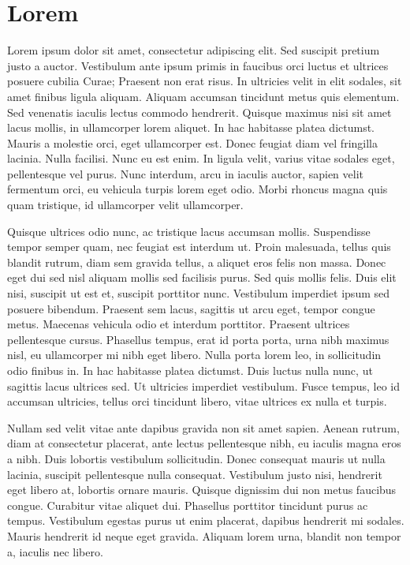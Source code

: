 \chapter{Lorem}

\setcounter{page}{1}

Lorem ipsum dolor sit amet, consectetur adipiscing elit. Sed suscipit pretium justo a auctor. Vestibulum ante ipsum primis in faucibus orci luctus et ultrices posuere cubilia Curae; Praesent non erat risus. In ultricies velit in elit sodales, sit amet finibus ligula aliquam. Aliquam accumsan tincidunt metus quis elementum. Sed venenatis iaculis lectus commodo hendrerit. Quisque maximus nisi sit amet lacus mollis, in ullamcorper lorem aliquet. In hac habitasse platea dictumst. Mauris a molestie orci, eget ullamcorper est. Donec feugiat diam vel fringilla lacinia. Nulla facilisi. Nunc eu est enim. In ligula velit, varius vitae sodales eget, pellentesque vel purus. Nunc interdum, arcu in iaculis auctor, sapien velit fermentum orci, eu vehicula turpis lorem eget odio. Morbi rhoncus magna quis quam tristique, id ullamcorper velit ullamcorper.

Quisque ultrices odio nunc, ac tristique lacus accumsan mollis. Suspendisse tempor semper quam, nec feugiat est interdum ut. Proin malesuada, tellus quis blandit rutrum, diam sem gravida tellus, a aliquet eros felis non massa. Donec eget dui sed nisl aliquam mollis sed facilisis purus. Sed quis mollis felis. Duis elit nisi, suscipit ut est et, suscipit porttitor nunc. Vestibulum imperdiet ipsum sed posuere bibendum. Praesent sem lacus, sagittis ut arcu eget, tempor congue metus. Maecenas vehicula odio et interdum porttitor. Praesent ultrices pellentesque cursus. Phasellus tempus, erat id porta porta, urna nibh maximus nisl, eu ullamcorper mi nibh eget libero. Nulla porta lorem leo, in sollicitudin odio finibus in. In hac habitasse platea dictumst. Duis luctus nulla nunc, ut sagittis lacus ultrices sed. Ut ultricies imperdiet vestibulum. Fusce tempus, leo id accumsan ultricies, tellus orci tincidunt libero, vitae ultrices ex nulla et turpis.

Nullam sed velit vitae ante dapibus gravida non sit amet sapien. Aenean rutrum, diam at consectetur placerat, ante lectus pellentesque nibh, eu iaculis magna eros a nibh. Duis lobortis vestibulum sollicitudin. Donec consequat mauris ut nulla lacinia, suscipit pellentesque nulla consequat. Vestibulum justo nisi, hendrerit eget libero at, lobortis ornare mauris. Quisque dignissim dui non metus faucibus congue. Curabitur vitae aliquet dui. Phasellus porttitor tincidunt purus ac tempus. Vestibulum egestas purus ut enim placerat, dapibus hendrerit mi sodales. Mauris hendrerit id neque eget gravida. Aliquam lorem urna, blandit non tempor a, iaculis nec libero.

